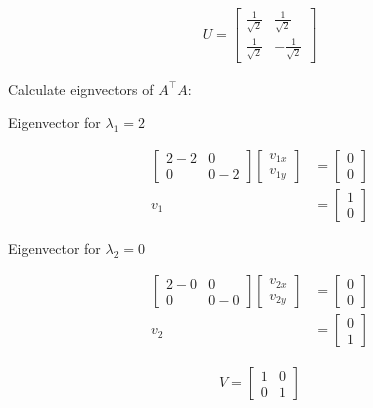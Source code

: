 \documentclass[11pt,letterpaper]{article}
\begin{document}
\begin{enumerate}
\begin{align*}
U = {\begin{bmatrix}
        \frac{1}{\sqrt{2}} & \frac{1}{\sqrt{2}} \\
        \frac{1}{\sqrt{2}} & -\frac{1}{\sqrt{2}}
    \end{bmatrix}}
\end{align*}

Calculate eignvectors of \( A^\top A \):

Eigenvector for \( \lambda_1 = 2 \)

\begin{align*}
    \begin{bmatrix}
        2-2 & 0 \\
        0 & 0-2
    \end{bmatrix}
    \begin{bmatrix}
        v_{1x} \\ v_{1y}
    \end{bmatrix}
    &= \begin{bmatrix}
        0 \\ 0
    \end{bmatrix} \\
    v_1
    &= \begin{bmatrix}
        1 \\ 0
    \end{bmatrix}
\end{align*}

Eigenvector for \( \lambda_2 = 0 \)

\begin{align*}
    \begin{bmatrix}
        2-0 & 0 \\
        0 & 0-0
    \end{bmatrix}
    \begin{bmatrix}
        v_{2x} \\ v_{2y}
    \end{bmatrix}
    &= \begin{bmatrix}
        0 \\ 0
    \end{bmatrix} \\
    v_2
    &= \begin{bmatrix}
        0 \\ 1
    \end{bmatrix}
\end{align*}

\begin{align*}
V = {\begin{bmatrix}
        1 & 0 \\
        0 & 1
    \end{bmatrix}}
\end{align*}


\end{enumerate}
\end{document}
